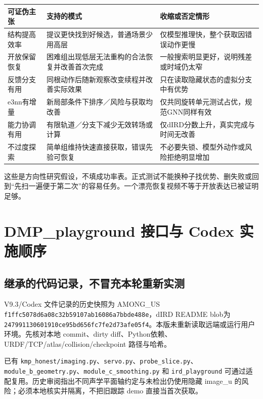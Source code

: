 \documentclass[UTF8,fontset=fandol,11pt,a4paper]{ctexart}
\theoremstyle{plain}
\theoremstyle{definition}
\theoremstyle{remark}
\numberwithin{equation}{section}
\newcommand{\code}[1]{\begingroup\small\nolinkurl{#1}\endgroup}
\begin{document}
\begin{longtable}{P{29mm}P{57mm}P{60mm}}
\toprule 可证伪主张 & 支持的模式 & 收缩或否定情形\\\midrule\endhead
结构提高效率 & 提议更快找到好候选，普通场景少用高层 & 仅模型推理快，整个获取因错误动作更慢\\
开放保留恢复 & 困难组出现低层无法重构的合法恢复并改善首次完成 & 一般搜索明显更好，说明残差或时域仍太窄\\
反馈分支有用 & 同根动作后随新观察改变续程并改善实际效果 & 只在读取隐藏状态的虚拟分支中有优势\\
e3nn有增量 & 新局部条件下排序／风险与获取均改善 & 仅共同旋转单元测试占优，规范GNN同样有效\\
能力协调有用 & 有限轨道／分支下减少无效转场或计算 & 仅dIRD分数上升，真实完成与时间无改善\\
不过度探索 & 简单组维持快速直接获取，错误先验可恢复 & 不必要失锁、模型外动作或风险拒绝明显增加\\\bottomrule
\end{longtable}

这些是方向性研究假设，不填成功率表。正式测试不能换种子找优势、删失败或回到“先扫一遍便于第二次”的容易任务。一个漂亮恢复视频不等于开放表达已被证明足够。

\section{DMP\_playground 接口与 Codex 实施顺序}
\label{sec:code}
\subsection{继承的代码记录，不冒充本轮重新实测}
V9.3/Codex 文件记录的历史快照为 AMONG\_US \code{f1ffc5078d6a08c32b59107ab16086a7bbde488e}，dIRD README blob为 \code{247991130601910ce95bd656fc7fe2d73afe05f4}\cite{v93,codex93}。本版未重新读取远端或运行用户环境。先核对本地 commit、dirty diff、Python依赖、URDF/TCP/atlas/collision/checkpoint 路径与哈希。

已有 \code{kmp_honest/imaging.py}、\code{servo.py}、\code{probe_slice.py}、\code{module_b_geometry.py}、\code{module_c_smoothing.py} 和 \code{ird_playground} 可通过适配复用。历史审阅指出不同声学平面轴约定与未检出仍使用隐藏 image\_u 的风险；必须本地核实并隔离，不把旧跟踪 demo 直接当首次获取。
\end{document}
